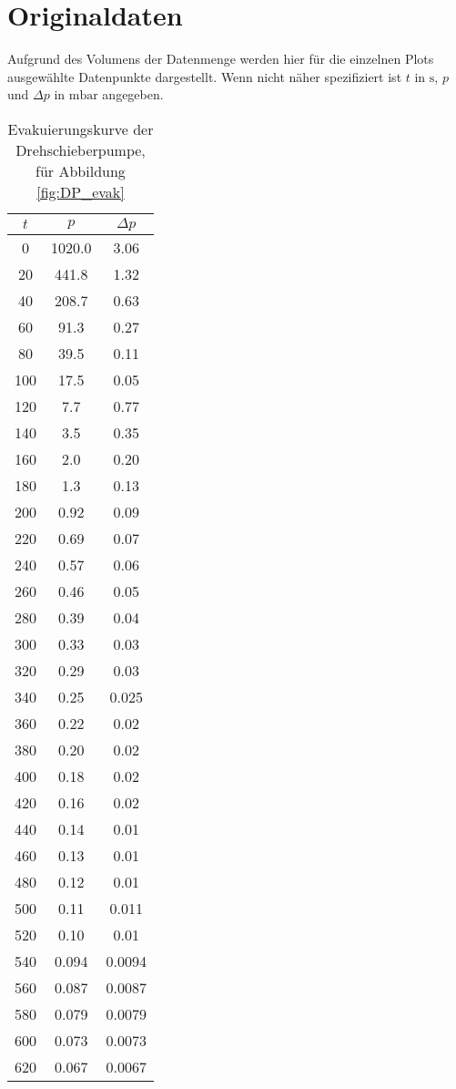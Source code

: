 \section{Originaldaten}
\label{sec:Originaldaten}

Aufgrund des Volumens der Datenmenge werden hier für die einzelnen Plots ausgewählte Datenpunkte dargestellt.
Wenn nicht näher spezifiziert ist $t$ in $\si{\second}$, $p$ und $\Delta p$ in $\si{\milli\bar}$ angegeben. 

\begin{table}[H]
    \centering
    \caption{Evakuierungskurve der Drehschieberpumpe, für Abbildung \ref{fig:DP_evak}}
    \label{tab:DP_Evak}
    \begin{tabular}{c c c}
        \toprule
        {$t$} & {$p$} & {$\Delta p$} \\
        \midrule
        0 & 1020.0 & 3.06\\
        20 & 441.8 & 1.32\\
        40 & 208.7 & 0.63\\
        60 & 91.3 & 0.27\\
        80 & 39.5 & 0.11\\
        100 & 17.5 & 0.05\\
        120 & 7.7 & 0.77\\
        140 & 3.5 & 0.35\\
        160 & 2.0 & 0.20\\
        180 & 1.3 & 0.13\\
        200 & 0.92 & 0.09\\
        220 & 0.69 & 0.07\\
        240 & 0.57 & 0.06\\
        260 & 0.46 & 0.05\\
        280 & 0.39 & 0.04\\
        300 & 0.33 & 0.03\\
        320 & 0.29 & 0.03\\
        340 & 0.25 & 0.025\\
        360 & 0.22 & 0.02\\
        380 & 0.20 & 0.02\\
        400 & 0.18 & 0.02\\
        420 & 0.16 & 0.02\\
        440 & 0.14 & 0.01\\
        460 & 0.13 & 0.01\\
        480 & 0.12 & 0.01\\
        500 & 0.11 & 0.011\\
        520 & 0.10 & 0.01\\
        540 & 0.094 & 0.0094\\
        560 & 0.087 & 0.0087\\
        580 & 0.079 & 0.0079\\
        600 & 0.073 & 0.0073\\
        620 & 0.067 & 0.0067 \\
        \bottomrule
    \end{tabular}
\end{table}

